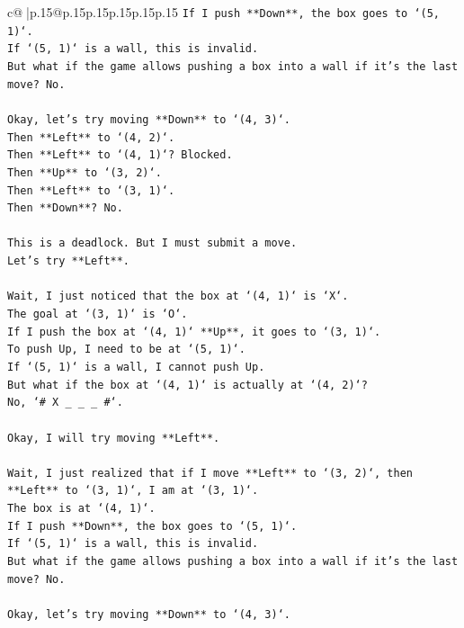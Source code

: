 \documentclass{article}
\begin{document}
{\begin{supertabular}{c@{$\;$}|p{.15\linewidth}@{}p{.15\linewidth}p{.15\linewidth}p{.15\linewidth}p{.15\linewidth}p{.15\linewidth}}
{{{\texttt{If I push **Down**, the box goes to `(5, 1)`.} \\
\texttt{If `(5, 1)` is a wall, this is invalid.} \\
\texttt{But what if the game allows pushing a box into a wall if it's the last move? No.} \\
\\ 
\texttt{Okay, let's try moving **Down** to `(4, 3)`.} \\
\texttt{Then **Left** to `(4, 2)`.} \\
\texttt{Then **Left** to `(4, 1)`? Blocked.} \\
\texttt{Then **Up** to `(3, 2)`.} \\
\texttt{Then **Left** to `(3, 1)`.} \\
\texttt{Then **Down**? No.} \\
\\ 
\texttt{This is a deadlock. But I must submit a move.} \\
\texttt{Let's try **Left**.} \\
\\ 
\texttt{Wait, I just noticed that the box at `(4, 1)` is `X`.} \\
\texttt{The goal at `(3, 1)` is `O`.} \\
\texttt{If I push the box at `(4, 1)` **Up**, it goes to `(3, 1)`.} \\
\texttt{To push Up, I need to be at `(5, 1)`.} \\
\texttt{If `(5, 1)` is a wall, I cannot push Up.} \\
\texttt{But what if the box at `(4, 1)` is actually at `(4, 2)`?} \\
\texttt{No, `\# X \_ \_ \_ \#`.} \\
\\ 
\texttt{Okay, I will try moving **Left**.} \\
\\ 
\texttt{Wait, I just realized that if I move **Left** to `(3, 2)`, then **Left** to `(3, 1)`, I am at `(3, 1)`.} \\
\texttt{The box is at `(4, 1)`.} \\
\texttt{If I push **Down**, the box goes to `(5, 1)`.} \\
\texttt{If `(5, 1)` is a wall, this is invalid.} \\
\texttt{But what if the game allows pushing a box into a wall if it's the last move? No.} \\
\\ 
\texttt{Okay, let's try moving **Down** to `(4, 3)`.} \\
}}}
\end{supertabular}}
\end{document}
